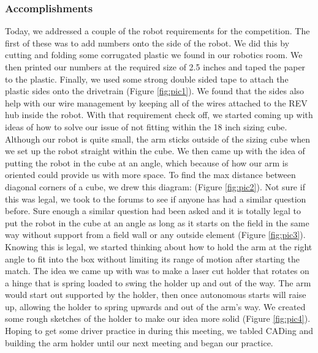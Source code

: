 \subsubsection*{Accomplishments}
Today, we addressed a couple of the robot requirements for the competition. The first of these was to add numbers onto the side of the robot. We did this by cutting and folding some corrugated plastic we found in our robotics room. We then printed our numbers at the required size of 2.5 inches and taped the paper to the plastic. Finally, we used some strong double sided tape to attach the plastic sides onto the drivetrain (Figure \ref{fig:pic1}). We found that the sides also help with our wire management by keeping all of the wires attached to the REV hub inside the robot.
With that requirement check off, we started coming up with ideas of how to solve our issue of not fitting within the 18 inch sizing cube. Although our robot is quite small, the arm sticks outside of the sizing cube when we set up the robot straight within the cube. We then came up with the idea of putting the robot in the cube at an angle, which because of how our arm is oriented could provide us with more space. To find the max distance between diagonal corners of a cube, we drew this diagram: (Figure \ref{fig:pic2}). Not sure if this was legal, we took to the forums to see if anyone has had a similar question before. Sure enough a similar question had been asked and it is totally legal to put the robot in the cube at an angle as long as it starts on the field in the same way without support from a field wall or any outside element (Figure \ref{fig:pic3}). Knowing this is legal, we started thinking about how to hold the arm at the right angle to fit into the box without limiting its range of motion after starting the match. The idea we came up with was to make a laser cut holder that rotates on a hinge that is spring loaded to swing the holder up and out of the way. The arm would start out supported by the holder, then once autonomous starts will raise up, allowing the holder to spring upwards and out of the arm’s way. We created some rough sketches of the holder to make our idea more solid (Figure \ref{fig:pic4}). Hoping to get some driver practice in during this meeting, we tabled CADing and building the arm holder until our next meeting and began our practice.

 

